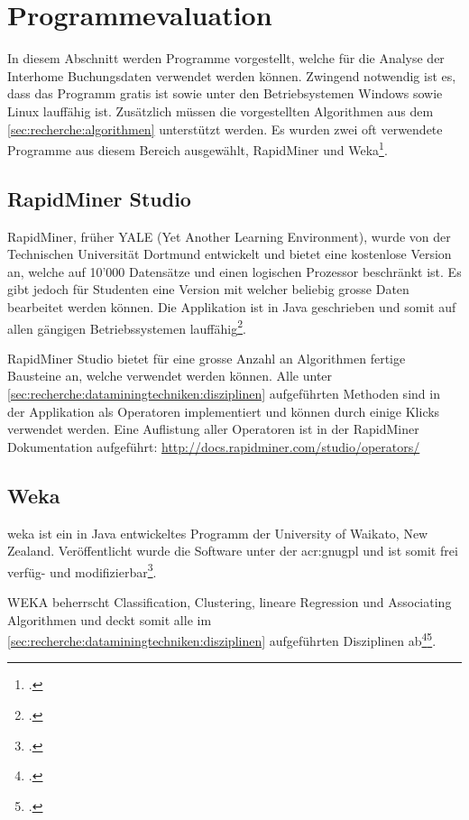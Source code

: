 \section{Programmevaluation}
\label{sec:recherche:programmevaluation}
In diesem Abschnitt werden Programme vorgestellt, welche für die Analyse der Interhome Buchungsdaten verwendet werden können. 
Zwingend notwendig ist es, dass das Programm gratis ist sowie unter den Betriebsystemen Windows sowie Linux lauffähig ist. Zusätzlich müssen die vorgestellten Algorithmen aus dem \cref{sec:recherche:algorithmen} unterstützt werden.
Es wurden zwei oft verwendete Programme aus diesem Bereich ausgewählt, RapidMiner und Weka\footcite{Six_of_the_Best_Open_Source_Data_Mining_Tools_-_The_New_Stack_2017-05-29}.



\subsection{RapidMiner Studio}
RapidMiner, früher YALE (Yet Another Learning Environment), wurde von der Technischen Universität Dortmund entwickelt und bietet eine kostenlose Version an, welche auf 10'000 Datensätze und einen logischen Prozessor beschränkt ist. Es gibt jedoch für Studenten eine Version mit welcher beliebig grosse Daten bearbeitet werden können. Die Applikation ist in Java geschrieben und somit auf allen gängigen Betriebssystemen lauffähig\footcite{RapidMiner_Studio_2017-01-14}.

RapidMiner Studio bietet für eine grosse Anzahl an Algorithmen fertige Bausteine an, welche verwendet werden können. Alle unter \cref{sec:recherche:dataminingtechniken:disziplinen} aufgeführten Methoden sind in der Applikation als Operatoren implementiert und können durch einige Klicks verwendet werden. Eine Auflistung aller Operatoren ist in der RapidMiner Dokumentation aufgeführt: \url{http://docs.rapidminer.com/studio/operators/}

\subsection{Weka}
\gls{weka} ist ein in Java entwickeltes Programm der University of Waikato, New Zealand. Veröffentlicht wurde die Software unter der \gls{acr:gnugpl} und ist somit frei verfüg- und modifizierbar\footcite{Weka_2017-01-14}.

WEKA beherrscht Classification, Clustering, lineare Regression und Associating Algorithmen und deckt somit alle  im \cref{sec:recherche:dataminingtechniken:disziplinen} aufgeführten Disziplinen ab\footcite{Weka_Doc_2017-01-14}\footcite{Weka_Regression_2017-01-14}.

